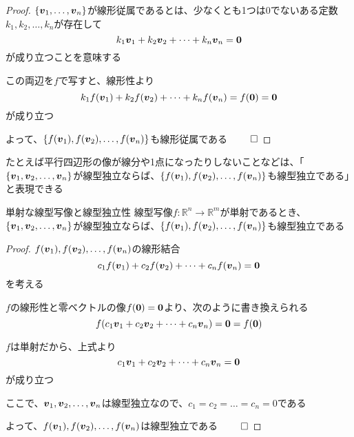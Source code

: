 \documentclass[../../../topic_linear-algebra]{subfiles}
\begin{document}
\begin{proof}
  $\{\vb*{v}_1, \dots, \vb*{v}_n\}$が線形従属であるとは、少なくとも1つは0でないある定数$k_1, k_2, \dots, k_n$が存在して
  \begin{equation*}
    k_1 \vb*{v}_1 + k_2 \vb*{v}_2 + \dots + k_n \vb*{v}_n = \vb*{0}
  \end{equation*}
  が成り立つことを意味する

  この両辺を$f$で写すと、線形性より
  \begin{equation*}
    k_1 f(\vb*{v}_1) + k_2 f(\vb*{v}_2) + \dots + k_n f(\vb*{v}_n) = f(\vb*{0}) = \vb*{0}
  \end{equation*}
  が成り立つ

  よって、$\{ f(\vb*{v}_1), f(\vb*{v}_2), \dots, f(\vb*{v}_n) \}$も線形従属である $\qed$
\end{proof}

\sectionline

たとえば平行四辺形の像が線分や1点になったりしないことなどは、「$\{ \vb*{v}_1, \vb*{v}_2, \dots, \vb*{v}_n \}$が線型独立ならば、$\{ f(\vb*{v}_1), f(\vb*{v}_2), \dots, f(\vb*{v}_n) \}$も線型独立である」と表現できる

\begin{theorem}{単射な線型写像と線型独立性}
  線型写像$f\colon \mathbb{R}^n \to \mathbb{R}^m$が単射であるとき、$\{ \vb*{v}_1, \vb*{v}_2, \dots, \vb*{v}_n \}$が線型独立ならば、$\{ f(\vb*{v}_1), f(\vb*{v}_2), \dots, f(\vb*{v}_n) \}$も線型独立である
\end{theorem}

\begin{proof}
  $f(\vb*{v}_1), f(\vb*{v}_2), \dots, f(\vb*{v}_n)$の線形結合
  \begin{equation*}
    c_1 f(\vb*{v}_1) + c_2 f(\vb*{v}_2) + \dots + c_n f(\vb*{v}_n) = \vb*{0}
  \end{equation*}
  を考える

  $f$の線形性と零ベクトルの像$f(\vb*{0}) = \vb*{0}$より、次のように書き換えられる
  \begin{equation*}
    f(c_1 \vb*{v}_1 + c_2 \vb*{v}_2 + \dots + c_n \vb*{v}_n) = \vb*{0} = f(\vb*{0})
  \end{equation*}

  $f$は単射だから、上式より
  \begin{equation*}
    c_1 \vb*{v}_1 + c_2 \vb*{v}_2 + \dots + c_n \vb*{v}_n = \vb*{0}
  \end{equation*}
  が成り立つ

  ここで、$\vb*{v}_1, \vb*{v}_2, \dots, \vb*{v}_n$は線型独立なので、$c_1 = c_2 = \dots = c_n = 0$である

  よって、$f(\vb*{v}_1), f(\vb*{v}_2), \dots, f(\vb*{v}_n)$は線型独立である $\qed$
\end{proof}
\end{document}
